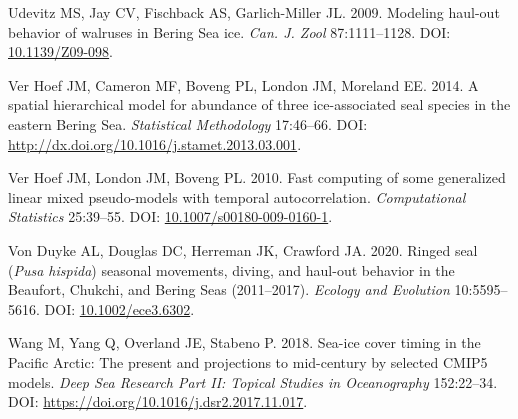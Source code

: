 \documentclass[fleqn,10pt,lineno]{wlpeerj} %
\newlength{\cslhangindent}
\newenvironment{CSLReferences}[2] %
 {\begin{list}{}{%
  \setlength{\itemindent}{0pt}
  \setlength{\leftmargin}{0pt}
  \setlength{\parsep}{0pt}
  \ifodd #1
   \setlength{\leftmargin}{\cslhangindent}
   \setlength{\itemindent}{-1\cslhangindent}
  \fi
  \setlength{\itemsep}{#2\baselineskip}}}
 {\end{list}}
\begin{document}
\begin{CSLReferences}{1}{0}
Udevitz MS, Jay CV, Fischback AS, Garlich-Miller JL. 2009. Modeling haul-out behavior of walruses in Bering Sea ice. \emph{Can. J. Zool} 87:1111--1128. DOI: \href{https://doi.org/10.1139/Z09-098}{10.1139/Z09-098}.

Ver Hoef JM, Cameron MF, Boveng PL, London JM, Moreland EE. 2014. A spatial hierarchical model for abundance of three ice-associated seal species in the eastern Bering Sea. \emph{Statistical Methodology} 17:46--66. DOI: \url{http://dx.doi.org/10.1016/j.stamet.2013.03.001}.

Ver Hoef JM, London JM, Boveng PL. 2010. Fast computing of some generalized linear mixed pseudo-models with temporal autocorrelation. \emph{Computational Statistics} 25:39--55. DOI: \href{https://doi.org/10.1007/s00180-009-0160-1}{10.1007/s00180-009-0160-1}.

Von Duyke AL, Douglas DC, Herreman JK, Crawford JA. 2020. Ringed seal (\emph{Pusa hispida}) seasonal movements, diving, and haul-out behavior in the Beaufort, Chukchi, and Bering Seas (2011--2017). \emph{Ecology and Evolution} 10:5595--5616. DOI: \href{https://doi.org/10.1002/ece3.6302}{10.1002/ece3.6302}.

Wang M, Yang Q, Overland JE, Stabeno P. 2018. Sea-ice cover timing in the Pacific Arctic: The present and projections to mid-century by selected CMIP5 models. \emph{Deep Sea Research Part II: Topical Studies in Oceanography} 152:22--34. DOI: \url{https://doi.org/10.1016/j.dsr2.2017.11.017}.

\end{CSLReferences}
\end{document}
